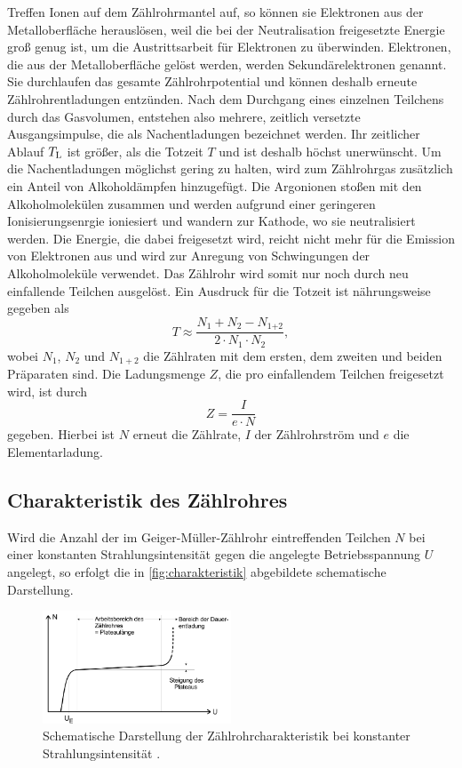 Treffen Ionen auf dem Zählrohrmantel auf, so können sie Elektronen aus der Metalloberfläche herauslösen, weil die bei der Neutralisation freigesetzte Energie groß genug ist, um die Austrittsarbeit für Elektronen zu überwinden.
Elektronen, die aus der Metalloberfläche gelöst werden, werden Sekundärelektronen genannt. Sie durchlaufen das gesamte Zählrohrpotential und können deshalb erneute Zählrohrentladungen entzünden. Nach dem Durchgang eines einzelnen Teilchens 
durch das Gasvolumen, entstehen also mehrere, zeitlich versetzte Ausgangsimpulse, die als Nachentladungen bezeichnet werden. Ihr zeitlicher Ablauf $T_{\text L}$ ist größer, als die Totzeit $T$ und ist deshalb höchst unerwünscht.
Um die Nachentladungen möglichst gering zu halten, wird zum Zählrohrgas zusätzlich ein Anteil von Alkoholdämpfen hinzugefügt. Die Argonionen stoßen mit den Alkoholmolekülen zusammen und werden aufgrund einer geringeren Ionisierungsenrgie ioniesiert und wandern zur Kathode, wo sie neutralisiert werden.
Die Energie, die dabei freigesetzt wird, reicht nicht mehr für die Emission von Elektronen aus und wird zur Anregung von Schwingungen der Alkoholmoleküle verwendet. Das Zählrohr wird somit nur noch durch neu einfallende Teilchen ausgelöst.
\newline
Ein Ausdruck für die Totzeit ist nährungsweise gegeben als
\begin{equation}
    T \approx \frac{N_1 + N_2 - N_\text{1+2}}{2 \cdot N_1 \cdot N_2},
    \label{eqn:tot}
\end{equation}
wobei $N_1$, $N_2$ und $N_{1+2}$ die Zählraten mit dem ersten, dem zweiten und beiden Präparaten sind.
Die Ladungsmenge $Z$, die pro einfallendem Teilchen freigesetzt wird, ist durch 
\begin{equation}
    Z = \frac{I}{e \cdot N}
    \label{eqn:ener}
\end{equation}
gegeben. Hierbei ist $N$ erneut die Zählrate, $I$ der Zählrohrström und $e$ die Elementarladung.


\subsection{Charakteristik des Zählrohres}
\label{subsec:ZaehlrohrCharakteristik}

Wird die Anzahl der im Geiger-Müller-Zählrohr eintreffenden Teilchen $N$ bei einer konstanten Strahlungsintensität gegen die angelegte Betriebsspannung $U$ angelegt, so erfolgt die in \autoref{fig:charakteristik} abgebildete schematische Darstellung.
\begin{figure}[H]
    \centering
    \includegraphics[width=0.5\textwidth]{data/charakteristik.png}
    \caption{Schematische Darstellung der Zählrohrcharakteristik bei konstanter Strahlungsintensität \cite{Anleitung703}.}
    \label{fig:charakteristik}
\end{figure}

